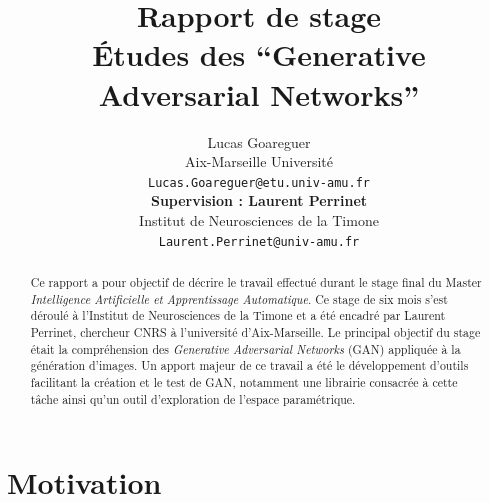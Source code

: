 \documentclass[11pt,francais]{article}
\title{Rapport de stage\\ Études des ``Generative Adversarial Networks''}
\author{Lucas Goareguer \\
  Aix-Marseille Université \\
  {\small \texttt{Lucas.Goareguer@etu.univ-amu.fr}   } \\\And
   {\bf Supervision : Laurent Perrinet} \\
  Institut de Neurosciences de la Timone \\
  {\small \tt Laurent.Perrinet@univ-amu.fr} \\}
\date{}
\begin{document}
\maketitle
\begin{abstract}
Ce rapport a pour objectif de décrire le travail effectué durant le stage final du Master \emph{Intelligence Artificielle et Apprentissage Automatique}. Ce stage de six mois s'est déroulé à l'Institut de Neurosciences de la Timone et a été encadré par Laurent Perrinet, chercheur CNRS à l'université d'Aix-Marseille. Le principal objectif du stage était la compréhension des \textit{Generative Adversarial Networks} (GAN) appliquée à la génération d'images. Un apport majeur de ce travail a été le développement d'outils facilitant la création et le test de GAN, notamment une librairie consacrée à cette tâche ainsi qu'un outil d'exploration de l'espace paramétrique.
\end{abstract}


\section{Motivation}
\end{document}
